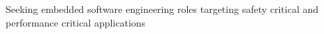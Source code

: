 

\begin{cvparagraph}


Seeking embedded software engineering roles targeting safety critical and performance critical applications

\end{cvparagraph}
